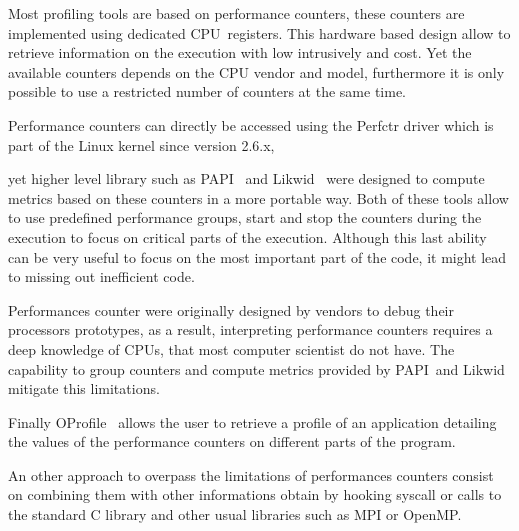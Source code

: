 Most profiling tools are based on performance counters, these counters are
implemented using dedicated \gls{CPU} registers. This hardware based design
allow to retrieve information on the execution with low intrusively and cost.
Yet the available counters depends on the \gls{CPU} vendor and model,
furthermore it is only possible to use a restricted number of counters at
the same time.

Performance counters can directly be accessed using the \gls{Perfctr} driver
which is part of the \gls{Linux} kernel since version 2.6.x, 

yet higher level library such as
\gls{PAPI}~\cite{Browne00Portable,Malony11Parallel,Weaver13PAPI} and
\gls{Likwid}~\cite{Treibig10LIKWID} were designed to compute metrics based on
these counters in a more portable way. Both of these tools allow to use
predefined performance groups, start and stop the counters during the
execution to focus on critical parts of the execution. Although this last
ability can be very useful to focus on the most important part of the code, it
might lead to missing out inefficient code.




Performances counter were originally designed by vendors to debug their
processors prototypes, as a result, interpreting performance counters requires
a deep knowledge of \glspl{CPU}, that most computer scientist do not have. The
capability to group counters and compute metrics provided by \gls{PAPI} and
\gls{Likwid} mitigate this limitations.



Finally \gls{OProfile}~\cite{Oprofile}
allows the user to retrieve a profile of an application detailing the values
of the performance counters on different parts of the program.

An other approach to overpass the limitations of performances counters consist
on combining them with other informations obtain by hooking syscall or
calls to the standard C library and other usual libraries such as MPI or
OpenMP.

